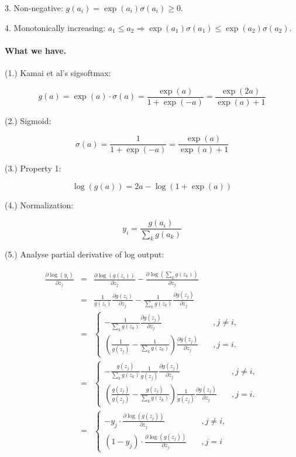 3. Non-negative: $g(a_i) = \exp(a_i) \sigma(a_i) \geq 0$.

4. Monotonically increasing: $a_1 \leq a_2 \Rightarrow \exp(a_1)\sigma(a_1) \leq \exp(a_2)\sigma(a_2)$.

\paragraph{What we have.}
(1.) Kamai et al's sigsoftmax: 

\begin{equation}
g(a) = \exp(a) \cdot \sigma(a) = \frac{\exp(a)}{1 + \exp(-a)} = \frac{\exp(2 a)}{\exp(a) + 1}
\end{equation}

(2.) Sigmoid:

\begin{equation}
\sigma(a) = \frac{1}{1 + \exp(-a)} = \frac{\exp(a)}{\exp(a)+1}
\end{equation}

(3.) Property 1: 

\begin{equation}
\log(g(a)) = 2 a - \log(1+\exp(a))
\label{eq: property 1}
\end{equation}

(4.) Normalization:

\begin{equation}
y_i = \frac{g(a_i)}{\sum_k g(a_k)}
\end{equation}

(5.) Analyse partial derivative of log output:

\begin{eqnarray}
\frac{\partial \log(y_i)}{\partial z_j}
&=& \frac{\partial \log(g(z_i))}{\partial z_j} - \frac{\partial \log(\sum_k g(z_k))}{\partial z_j}
\nonumber \\
&=& \frac{1}{g(z_i)} \frac{\partial g(z_i)}{\partial z_j} - \frac{1}{\sum_k g(z_k)} \frac{\partial g(z_j)}{\partial z_j}
\nonumber \\
&=& \left\{
\begin{array}{ll}
- \frac{1}{\sum_k g(z_k)} \frac{\partial g(z_j)}{\partial z_j}
 & \quad, j \neq i, \\
\left(\frac{1}{g(z_j)}  - \frac{1}{\sum_k g(z_k)}\right) \frac{\partial g(z_j)}{\partial z_j}
 & \quad, j = i.
\end{array}
\right. 
\nonumber \\
&=& \left\{
\begin{array}{ll}
- \frac{g(z_j)}{\sum_k g(z_k)} \frac{1}{g(z_j)} \frac{\partial g(z_j)}{\partial z_j}
 & \quad, j \neq i, \\
\left(\frac{g(z_j)}{g(z_j)}  - \frac{g(z_j)}{\sum_k g(z_k)}\right) \frac{1}{g(z_j)} \frac{\partial g(z_j)}{\partial z_j}
 & \quad, j = i.
\end{array}
\right. 
\nonumber \\
&=& \left\{
\begin{array}{ll}
-y_j \cdot \frac{\partial \log(g(z_j))}{\partial z_j}
 & \quad, j \neq i, \\
(1-y_j) \cdot \frac{\partial \log(g(z_j))}{\partial z_j}
 & \quad, j = i 
\end{array}
\right. 
\end{eqnarray} 


